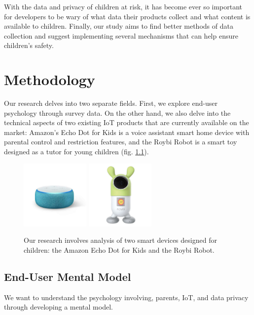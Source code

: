 \documentclass[12pt]{ucthesis}
\begin{document}
With the data and privacy of children at risk, it has become ever so important for developers to be wary of what data their products collect and what content is available to children. Finally, our study aims to find better methods of data collection and suggest implementing several mechanisms that can help ensure children's safety. 

\chapter{Methodology}
\label{ch:methodology}
Our research delves into two separate fields. First, we explore end-user psychology through survey data. On the other hand, we also delve into the technical aspects of two existing IoT products that are currently available on the market: Amazon's Echo Dot for Kids is a voice assistant smart home device with parental control and restriction features, and the Roybi Robot is a smart toy designed as a tutor for young children (fig. \ref{fig:devices}).

\begin{figure}
    \centering
    \includegraphics[width=0.3\textwidth]{echo.jpg}
    \includegraphics[width=0.3\textwidth]{roybi.jpg}
    \caption{Our research involves analysis of two smart devices designed for children: the Amazon Echo Dot for Kids and the Roybi Robot.}
    \label{fig:devices}
\end{figure}

\section{End-User Mental Model}
We want to understand the psychology involving, parents, IoT, and data privacy through developing a mental model.
\end{document}
